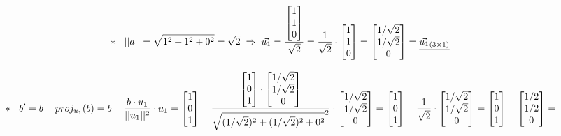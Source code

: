 \documentclass[fleqn]{article}
\newcommand{\skato}{\hspace{0.1cm}}
\newcommand{\skata}{\hspace{0.321cm}}
\begin{document}
\[
* \skata 
||a|| = \sqrt{1^2+1^2+0^2}= \sqrt{2} \skato \Rightarrow \skato
\vec{u_1} = \frac{\begin{bmatrix} 1\\1\\0 \end{bmatrix}}{\sqrt{2}}=
\frac{1}{\sqrt{2}} \cdot \begin{bmatrix} 1\\1\\0 \end{bmatrix} =
{\begin{bmatrix} 1/\sqrt{2}\\1/\sqrt{2}\\0 \end{bmatrix}=
\underline{ \vec{u_1}_{(3\times1)}} }
\]

\[
* \skata
b' = b - proj_{u_1}(b) = b - \frac{b \cdot u_1}{||u_1||^2} \cdot u_1 = \begin{bmatrix} 1\\0\\1 \end{bmatrix} -
\frac{\begin{bmatrix} 1\\0\\1 \end{bmatrix} \cdot \begin{bmatrix} 1/\sqrt{2}\\1/\sqrt{2}\\0 \end{bmatrix}}{\sqrt{(1/\sqrt{2})^2+(1/\sqrt{2})^2+0^2}^2} \cdot \begin{bmatrix} 1/\sqrt{2}\\1/\sqrt{2}\\0 \end{bmatrix}
= \begin{bmatrix} 1\\0\\1 \end{bmatrix} - \frac{1}{\sqrt{2}} \cdot \begin{bmatrix} 1/\sqrt{2}\\1/\sqrt{2}\\0 \end{bmatrix}
= \begin{bmatrix} 1\\0\\1 \end{bmatrix} -
\begin{bmatrix} 1/2\\1/2\\0 \end{bmatrix}
=
\]
\end{document}
